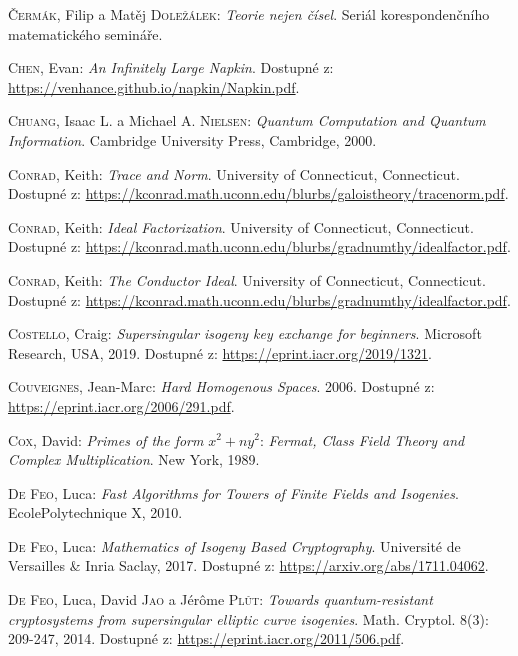 \documentclass [12pt]{report}
\begin{document}
\begin{thebibliography}{97}

\textsc{Čermák}, Filip a Matěj \textsc{Doležálek}: \textit{Teorie nejen čísel}. Seriál korespondenčního matematického semináře.

\textsc{Chen}, Evan: \textit{An Infinitely Large Napkin}. Dostupné z: \url{https://venhance.github.io/napkin/Napkin.pdf}.

\textsc{Chuang}, Isaac L. a Michael A. \textsc{Nielsen}: \textit{Quantum Computation and Quantum Information}. Cambridge University Press, Cambridge, 2000. 

\textsc{Conrad}, Keith: \textit{Trace and Norm}. University of Connecticut, Connecticut. Dostupné z: \url{https://kconrad.math.uconn.edu/blurbs/galoistheory/tracenorm.pdf}.

\textsc{Conrad}, Keith: \textit{Ideal Factorization}. University of Connecticut, Connecticut. Dostupné z: \url{https://kconrad.math.uconn.edu/blurbs/gradnumthy/idealfactor.pdf}.

\textsc{Conrad}, Keith: \textit{The Conductor Ideal}. University of Connecticut, Connecticut. Dostupné z: \url{https://kconrad.math.uconn.edu/blurbs/gradnumthy/idealfactor.pdf}.


\textsc{Costello}, Craig: \textit{Supersingular isogeny key exchange for beginners}. Microsoft Research, USA, 2019. Dostupné z: \url{https://eprint.iacr.org/2019/1321}.

\textsc{Couveignes}, Jean-Marc: \textit{Hard Homogenous Spaces}. 2006. Dostupné z: \url{https://eprint.iacr.org/2006/291.pdf}.

\textsc{Cox}, David: \textit{Primes of the form} $x^2+n y^2$: \textit{Fermat, Class Field Theory and Complex Multiplication}. New York, 1989.

\textsc{De Feo}, Luca: \textit{Fast Algorithms for Towers of Finite Fields and Isogenies}. EcolePolytechnique X, 2010. 

\textsc{De Feo}, Luca: \textit{Mathematics of Isogeny Based Cryptography}. Université de Versailles \& Inria Saclay, 2017. Dostupné z: \url{https://arxiv.org/abs/1711.04062}.

\textsc{De Feo}, Luca, David \textsc{Jao} a Jérôme \textsc{Plût}: \textit{Towards quantum-resistant cryptosystems from supersingular elliptic curve isogenies}. Math. Cryptol. 8(3): 209-247, 2014. Dostupné z: \url{https://eprint.iacr.org/2011/506.pdf}.


\end{thebibliography}
\end{document}
